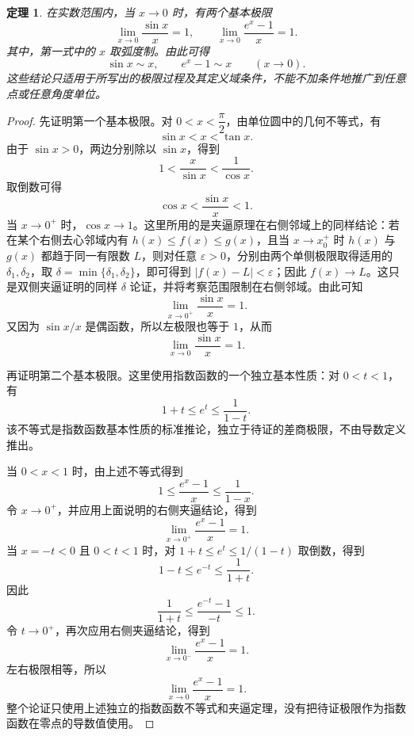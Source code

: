 \documentclass[UTF8,fontset=fandol,11pt]{ctexart}
\newtheorem{theorem}[definition]{定理}
\begin{document}
\begin{theorem}
在实数范围内，当 $x\to0$ 时，有两个基本极限
\[
\lim_{x\to0}\frac{\sin x}{x}=1,
\qquad
\lim_{x\to0}\frac{e^x-1}{x}=1.
\]
其中，第一式中的 $x$ 取弧度制。由此可得
\[
\sin x\sim x,
\qquad
 e^x-1\sim x\qquad(x\to0).
\]
这些结论只适用于所写出的极限过程及其定义域条件，不能不加条件地推广到任意点或任意角度单位。\label{thm:fundamental-limits}
\end{theorem}
\begin{proof}
先证明第一个基本极限。对 $0<x<\dfrac{\pi}{2}$，由单位圆中的几何不等式，有
\[
\sin x<x<\tan x.
\]
由于 $\sin x>0$，两边分别除以 $\sin x$，得到
\[
1<\frac{x}{\sin x}<\frac{1}{\cos x}.
\]
取倒数可得
\[
\cos x<\frac{\sin x}{x}<1.
\]
当 $x\to0^+$ 时，$\cos x\to1$。这里所用的是夹逼原理在右侧邻域上的同样结论：若在某个右侧去心邻域内有 $h(x)\leq f(x)\leq g(x)$，且当 $x\to x_0^+$ 时 $h(x)$ 与 $g(x)$ 都趋于同一有限数 $L$，则对任意 $\varepsilon>0$，分别由两个单侧极限取得适用的 $\delta_1,\delta_2$，取 $\delta=\min\{\delta_1,\delta_2\}$，即可得到 $|f(x)-L|<\varepsilon$；因此 $f(x)\to L$。这只是双侧夹逼证明的同样 $\delta$ 论证，并将考察范围限制在右侧邻域。由此可知
\[
\lim_{x\to0^+}\frac{\sin x}{x}=1.
\]
又因为 $\sin x/x$ 是偶函数，所以左极限也等于 $1$，从而
\[
\lim_{x\to0}\frac{\sin x}{x}=1.
\]

再证明第二个基本极限。这里使用指数函数的一个独立基本性质：对 $0<t<1$，有
\[
1+t\le e^t\le\frac{1}{1-t}.
\]
该不等式是指数函数基本性质的标准推论，独立于待证的差商极限，不由导数定义推出。

当 $0<x<1$ 时，由上述不等式得到
\[
1\le\frac{e^x-1}{x}\le\frac{1}{1-x}.
\]
令 $x\to0^+$，并应用上面说明的右侧夹逼结论，得到
\[
\lim_{x\to0^+}\frac{e^x-1}{x}=1.
\]
当 $x=-t<0$ 且 $0<t<1$ 时，对 $1+t\le e^t\le1/(1-t)$ 取倒数，得到
\[
1-t\le e^{-t}\le\frac{1}{1+t}.
\]
因此
\[
\frac{1}{1+t}\le\frac{e^{-t}-1}{-t}\le1.
\]
令 $t\to0^+$，再次应用右侧夹逼结论，得到
\[
\lim_{x\to0^-}\frac{e^x-1}{x}=1.
\]
左右极限相等，所以
\[
\lim_{x\to0}\frac{e^x-1}{x}=1.
\]
整个论证只使用上述独立的指数函数不等式和夹逼定理，没有把待证极限作为指数函数在零点的导数值使用。
\end{proof}
\end{document}
